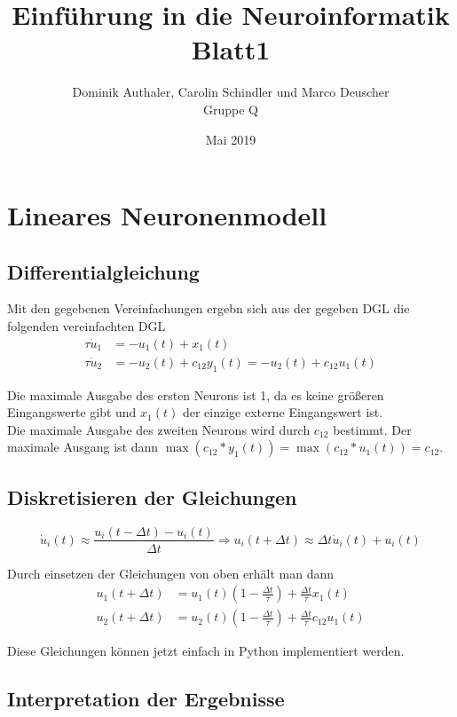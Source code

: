 \documentclass[a4paper]{article}
\title{Einführung in die Neuroinformatik Blatt1}
\author{Dominik Authaler, Carolin Schindler und Marco Deuscher\\Gruppe Q}
\date{Mai 2019}
\begin{document}
\maketitle

\section{Lineares Neuronenmodell}
\subsection{Differentialgleichung}
Mit den gegebenen Vereinfachungen ergebn sich aus der gegeben DGL die folgenden
vereinfachten DGL
\begin{align*}
    \tau \dot{u}_1&=-u_1(t)+x_1(t)\\
    \tau\dot{u}_2&=-u_2(t)+c_{12}y_1(t)=-u_2(t)+c_{12}u_1(t)
\end{align*}

Die maximale Ausgabe des ersten Neurons ist 1, da es keine größeren Eingangswerte gibt und $x_1(t)$ der einzige externe Eingangswert ist.\\
Die maximale Ausgabe des zweiten Neurons wird durch $c_12$ bestimmt. Der maximale Ausgang ist dann $\operatorname{max}(c_{12}*y_1(t))=\operatorname{max}(c_{12}*u_1(t))=c_{12}$.

\subsection{Diskretisieren der Gleichungen}
\begin{equation*}
    \dot{u}_i(t)\approx\frac{u_i(t-\Delta t)-u_i(t)}{\Delta t} \Rightarrow u_i(t+\Delta t)\approx \Delta t \dot{u}_i(t)+u_i(t)
\end{equation*}

Durch einsetzen der Gleichungen von oben erhält man dann
\begin{align*}
    u_1(t+\Delta t)&=u_1(t)(1-\frac{\Delta t}{\tau})+\frac{\Delta t}{\tau}x_1(t)\\
    u_2(t+\Delta t)&=u_2(t)(1-\frac{\Delta t}{\tau})+\frac{\Delta t}{\tau}c_{12}u_1(t)
\end{align*}

Diese Gleichungen können jetzt einfach in Python implementiert werden.


\subsection{Interpretation der Ergebnisse}
\end{document}
